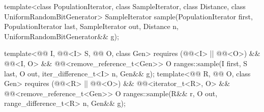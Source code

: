 %
\begin{itemdecl}
template<class PopulationIterator, class SampleIterator,
         class Distance, class UniformRandomBitGenerator>
  SampleIterator sample(PopulationIterator first, PopulationIterator last,
                        SampleIterator out, Distance n,
                        UniformRandomBitGenerator&& g);

template<@@ I, @@<I> S, @@ O, class Gen>
  requires (@@<I> || @@<O>) &&
           @@<I, O> &&
           @@<remove_reference_t<Gen>>
  O ranges::sample(I first, S last, O out, iter_difference_t<I> n, Gen&& g);
template<@@ R, @@ O, class Gen>
  requires (@@<R> || @@<O>) &&
           @@<iterator_t<R>, O> &&
           @@<remove_reference_t<Gen>>
  O ranges::sample(R&& r, O out, range_difference_t<R> n, Gen&& g);
\end{itemdecl}

